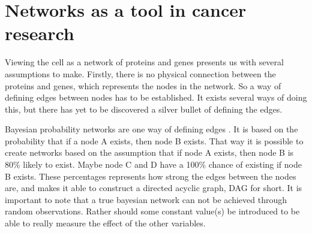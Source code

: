 \documentclass[UKenglish]{ifimaster}
\begin{document}
\chapter{Networks as a tool in cancer research}
Viewing the cell as a network of proteins and genes presents us with several assumptions to make. Firstly, there is no
physical connection between the proteins and genes, which represents the nodes in the network. So a way of defining
edges between nodes has to be established. It exists several ways of doing this, but there has yet to be discovered a
silver bullet of defining the edges. %

Bayesian probability networks are one way of defining edges \cite{bayesiannetworks}. It is based on the probability that
if a node A exists, then node B exists. That way it is possible to create networks based on the assumption that if node
A exists, then node B is 80\% likely to exist. Maybe node C and D have a 100\% chance of existing if node B exists.
These percentages represents how strong the edges between the nodes are, and makes it able to construct a directed
acyclic graph, DAG for short. It is important to note that a true bayesian network can not be achieved through random 
observations. Rather should some constant value(s) be introduced to be able to really measure the effect of the other
variables.
\end{document}
